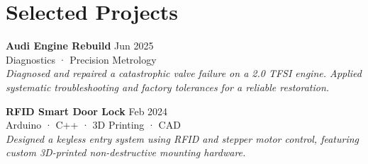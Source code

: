 \documentclass[10pt, a4paper]{article}
\begin{document}
\begin{minipage}[t]{0.64\linewidth}
\vspace{0.4em}

\section{Selected Projects}

\textbf{Audi Engine Rebuild} \hfill \textcolor{subtle}{\small Jun 2025}\\[0.15em]
\textcolor{subtle}{\footnotesize Diagnostics · Precision Metrology}\\
\textit{\footnotesize Diagnosed and repaired a catastrophic valve failure on a 2.0 TFSI engine. Applied systematic troubleshooting and factory tolerances for a reliable restoration.}

\vspace{0.5em}

\textbf{RFID Smart Door Lock} \hfill \textcolor{subtle}{\small Feb 2024}\\[0.15em]
\textcolor{subtle}{\footnotesize Arduino · C++ · 3D Printing · CAD}\\
\textit{\footnotesize Designed a keyless entry system using RFID and stepper motor control, featuring custom 3D-printed non-destructive mounting hardware.}

\end{minipage}
\hfill
\end{document}
